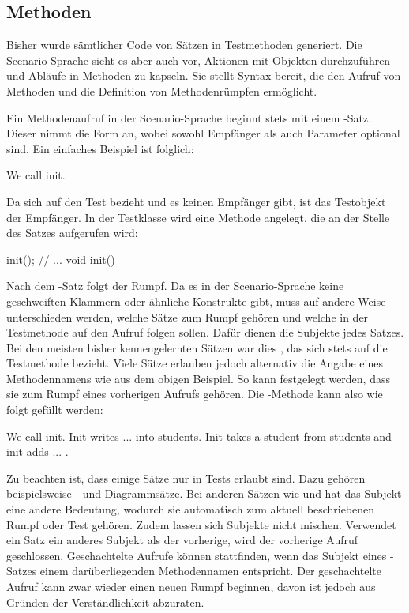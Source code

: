 \subsection{Methoden}\label{subsec:methods}

Bisher wurde sämtlicher Code von Sätzen in Testmethoden generiert.
Die Scenario-Sprache sieht es aber auch vor, Aktionen mit Objekten durchzuführen und Abläufe in Methoden zu kapseln.
Sie stellt Syntax bereit, die den Aufruf von Methoden und die Definition von Methodenrümpfen ermöglicht.

Ein Methodenaufruf in der Scenario-Sprache beginnt stets mit einem -Satz.
Dieser nimmt die Form  an, wobei sowohl Empfänger als auch Parameter optional sind.
Ein einfaches Beispiel ist folglich:

\begin{codeblock}
    We call init.
\end{codeblock}

Da sich  auf den Test bezieht und es keinen Empfänger gibt, ist das Testobjekt der Empfänger.
In der Testklasse wird eine Methode  angelegt, die an der Stelle des Satzes aufgerufen wird:

\begin{jcodeblock}
    init();
    // ...
    void init() {
    }
\end{jcodeblock}

Nach dem -Satz folgt der Rumpf.
Da es in der Scenario-Sprache keine geschweiften Klammern oder ähnliche Konstrukte gibt, muss auf andere Weise unterschieden werden, welche Sätze zum Rumpf gehören und welche in der Testmethode auf den Aufruf folgen sollen.
Dafür dienen die Subjekte jedes Satzes.
Bei den meisten bisher kennengelernten Sätzen war dies , das sich stets auf die Testmethode bezieht.
Viele Sätze erlauben jedoch alternativ die Angabe eines Methodennamens wie  aus dem obigen Beispiel.
So kann festgelegt werden, dass sie zum Rumpf eines vorherigen Aufrufs gehören.
Die -Methode kann also wie folgt gefüllt werden:

\begin{codeblock}
    We call init.
    Init writes ... into students.
    Init takes a student from students and init adds ... .
\end{codeblock}

Zu beachten ist, dass einige Sätze nur in Tests erlaubt sind.
Dazu gehören beispielsweise - und Diagrammsätze.
Bei anderen Sätzen wie  und  hat das Subjekt eine andere Bedeutung, wodurch sie automatisch zum aktuell beschriebenen Rumpf oder Test gehören.
Zudem lassen sich Subjekte nicht mischen.
Verwendet ein Satz ein anderes Subjekt als der vorherige, wird der vorherige Aufruf geschlossen.
Geschachtelte Aufrufe können stattfinden, wenn das Subjekt eines -Satzes einem darüberliegenden Methodennamen entspricht.
Der geschachtelte Aufruf kann zwar wieder einen neuen Rumpf beginnen, davon ist jedoch aus Gründen der Verständlichkeit abzuraten.

